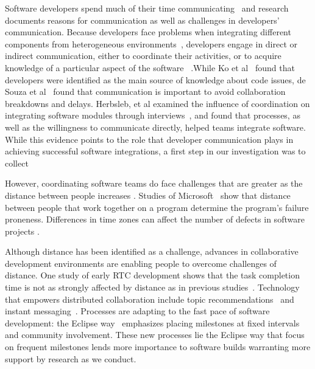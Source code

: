 Software developers spend much of their time
communicating~\cite{perry94} and research documents reasons for communication as well as challenges in developers' communication. Because developers face
problems when integrating different components from heterogeneous environments~\cite{redmiles2007:continuous},
developers engage in direct or indirect
communication, either to coordinate their activities, or to acquire knowledge of
a particular aspect of the software ~\cite{nakakoji2010:rdc}.While Ko et al~\cite{ko:icse:2007} found that developers were identified as the main source of knowledge about code issues, de Souza et al~\cite{desouza2007:awarenessnetwork} found that 
communication is important to avoid collaboration breakdowns and delays.
Herbsleb, et al examined the influence of coordination on integrating software
modules through interviews~\cite{herbsleb1999:architectures}, and found that
processes, as well as the willingness to communicate directly, helped teams
integrate software. While this evidence points to the role that developer communication plays in achieving successful software integrations, a first step in our investigation was to collect 

However, coordinating software teams do face challenges that are greater as the distance between people increases \cite{herbsleb:icse:2001}.
Studies of Microsoft~\cite{bird2009:dds_quality,nagappan:icse:2008}
show that distance between people that work together on a
program determine the program's failure proneness.
Differences in time zones can affect the number of defects in software projects \cite{cataldo2009:quality}.

Although distance has been identified as a challenge, advances in collaborative
development environments are enabling people to overcome challenges of distance.
One study of early RTC development
shows that the task completion time is not as strongly affected by distance as in previous studies~\cite{Nguyen:2008Distance}. Technology that empowers distributed collaboration include topic recommendations~\cite{carter2004} and instant messaging~\cite{niinimaki2008}. Processes are adapting to the fast pace of software development: the Eclipse way~\cite{frost:ieeesoftware:2007} emphasizes placing milestones at fixed intervals and community involvement.
These new processes lie the Eclipse way that focus on frequent milestones lends more importance to software builds warranting more support by research as we conduct.

